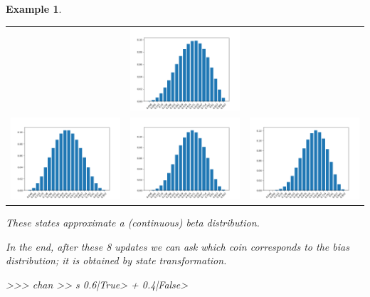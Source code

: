\documentclass[leqno]{tufte-book} %
\newtheorem{example}[theorem]{Example}
\begin{document}
\begin{example}
\begin{center}
\begin{tabular}{ccc}
&
\includegraphics[width=15em]{Pictures/disc_coin_parameter-5.png}
\\
\includegraphics[width=15em]{Pictures/disc_coin_parameter-6.png} 
&
\includegraphics[width=15em]{Pictures/disc_coin_parameter-7.png}
&
\includegraphics[width=15em]{Pictures/disc_coin_parameter-8.png}
\end{tabular}
\end{center}

\noindent These states approximate a (continuous) beta
distribution.

In the end, after these 8 updates we can ask which coin corresponds to
the bias distribution; it is obtained by state transformation.
\begin{python}
>>> chan >> s
0.6|True> + 0.4|False>
\end{python}


\end{example}
\end{document}
